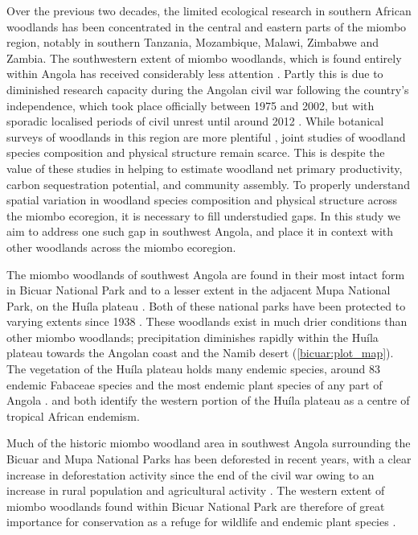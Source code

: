 \begin{refsection}
Over the previous two decades, the limited ecological research in southern African woodlands has been concentrated in the central and eastern parts of the miombo region, notably in southern Tanzania, Mozambique, Malawi, Zimbabwe and Zambia. The southwestern extent of miombo woodlands, which is found entirely within Angola has received considerably less attention \citep{Huntley2019}. Partly this is due to diminished research capacity during the Angolan civil war following the country's independence, which took place officially between 1975 and 2002, but with sporadic localised periods of civil unrest until around 2012 \citep{Oliveira2015}. While botanical surveys of woodlands in this region are more plentiful \citep{Huntley2019, Figueiredo2009}, joint studies of woodland species composition and physical structure remain scarce. This is despite the value of these studies in helping to estimate woodland net primary productivity, carbon sequestration potential, and community assembly. To properly understand spatial variation in woodland species composition and physical structure across the miombo ecoregion, it is necessary to fill understudied gaps. In this study we aim to address one such gap in southwest Angola, and place it in context with other woodlands across the miombo ecoregion.

The miombo woodlands of southwest Angola are found in their most intact form in Bicuar National Park and to a lesser extent in the adjacent Mupa National Park, on the Hu\'{i}la plateau \citep{Chisingui2018}. Both of these national parks have been protected to varying extents since 1938 \citep{Huntley2019}. These woodlands exist in much drier conditions than other miombo woodlands; precipitation diminishes rapidly within the Hu\'{i}la plateau towards the Angolan coast and the Namib desert (\autoref{bicuar:plot_map}). The vegetation of the Hu\'{i}la plateau holds many endemic species, around 83 endemic Fabaceae species \citep{Soares2007} and the most endemic plant species of any part of Angola \citep{Figueiredo2009}. \citet{Linder2001} and \citet{Droissart2018} both identify the western portion of the Hu\'{i}la plateau as a centre of tropical African endemism.

Much of the historic miombo woodland area in southwest Angola surrounding the Bicuar and Mupa National Parks has been deforested in recent years, with a clear increase in deforestation activity since the end of the civil war owing to an increase in rural population and agricultural activity \citep{Schneibel2013, Huntley2019}. The western extent of miombo woodlands found within Bicuar National Park are therefore of great importance for conservation as a refuge for wildlife and endemic plant species \citep{Huntley2019, Silva2020}.


\end{refsection}
